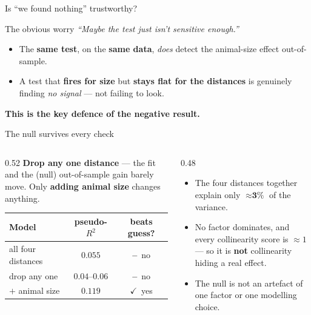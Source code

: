 \documentclass[aspectratio=169,11pt]{beamer}
\newcommand{\ck}{{\color{forest}$\checkmark$}}
\newcommand{\no}{{\color{burnt}\textbf{--}}}
\begin{document}
\begin{frame}{Is ``we found nothing'' trustworthy?}
  \begin{block}{The obvious worry}
    \centering\footnotesize \emph{``Maybe the test just isn't sensitive enough.''}
  \end{block}
  \vspace{0.4em}
  \begin{itemize}
    \item The \textbf{same test}, on the \textbf{same data}, \emph{does} detect the animal-size effect
          out-of-sample.
    \item A test that \textbf{fires for size} but \textbf{stays flat for the distances} is genuinely finding
          \emph{no signal} --- not failing to look.
  \end{itemize}
  \vspace{0.3em}
  \begin{block}{}
    \centering \textbf{This is the key defence of the negative result.}
  \end{block}
\end{frame}

\begin{frame}{The null survives every check}
  \begin{columns}[T]
    \begin{column}{0.52\textwidth}
      \footnotesize \textbf{Drop any one distance} --- the fit and the (null) out-of-sample gain barely move.
      Only \textbf{adding animal size} changes anything.
      \vspace{2pt}
      \begin{table}\scriptsize
      \begin{tabular}{lcc}
        \toprule
        Model & pseudo-$R^2$ & beats guess? \\
        \midrule
        all four distances & $0.055$        & \no\ no \\
        drop any one       & $0.04$--$0.06$ & \no\ no \\
        $+$ animal size    & $0.119$        & \ck\ yes \\
        \bottomrule
      \end{tabular}
      \end{table}
    \end{column}
    \begin{column}{0.48\textwidth}
      \begin{itemize}\footnotesize
        \item The four distances together explain only $\approx\textbf{3\%}$ of the variance.
        \item No factor dominates, and every collinearity score is $\approx1$ --- so it is \textbf{not}
              collinearity hiding a real effect.
        \item The null is not an artefact of one factor or one modelling choice.
      \end{itemize}
    \end{column}
  \end{columns}
\end{frame}
\end{document}
